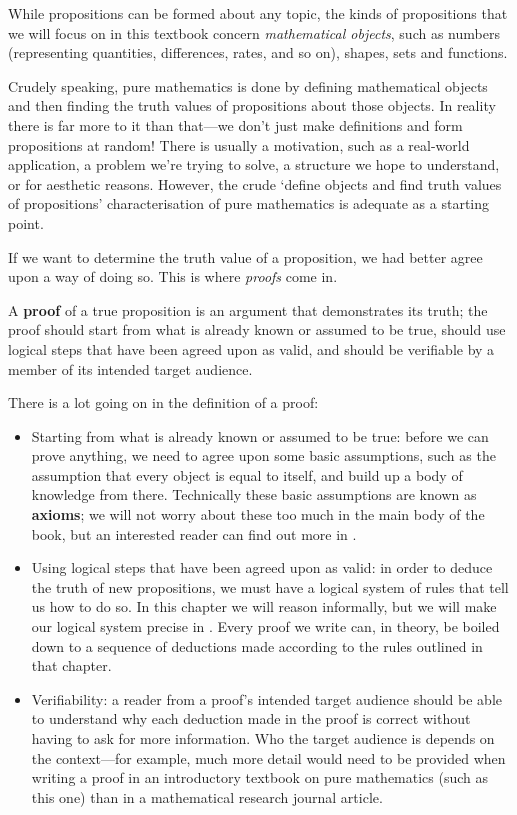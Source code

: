 While propositions can be formed about any topic, the kinds of propositions that we will focus on in this textbook concern \textit{mathematical objects}, such as numbers (representing quantities, differences, rates, and so on), shapes, sets and functions.

Crudely speaking, pure mathematics is done by defining mathematical objects and then finding the truth values of propositions about those objects. In reality there is far more to it than that---we don't just make definitions and form propositions at random! There is usually a motivation, such as a real-world application, a problem we're trying to solve, a structure we hope to understand, or for aesthetic reasons. However, the crude `define objects and find truth values of propositions' characterisation of pure mathematics is adequate as a starting point.

If we want to determine the truth value of a proposition, we had better agree upon a way of doing so. This is where \textit{proofs} come in.

\begin{definition}
\label{defProof}
A \textbf{proof} of a true proposition is an argument that demonstrates its truth; the proof should start from what is already known or assumed to be true, should use logical steps that have been agreed upon as valid, and should be verifiable by a member of its intended target audience.
\end{definition}

There is a lot going on in the definition of a proof:
\begin{itemize}
\item Starting from what is already known or assumed to be true: before we can prove anything, we need to agree upon some basic assumptions, such as the assumption that every object is equal to itself, and build up a body of knowledge from there. Technically these basic assumptions are known as \textbf{axioms}; we will not worry about these too much in the main body of the book, but an interested reader can find out more in .
\item Using logical steps that have been agreed upon as valid: in order to deduce the truth of new propositions, we must have a logical system of rules that tell us how to do so. In this chapter we will reason informally, but we will make our logical system precise in . Every proof we write can, in theory, be boiled down to a sequence of deductions made according to the rules outlined in that chapter.
\item Verifiability: a reader from a proof's intended target audience should be able to understand why each deduction made in the proof is correct without having to ask for more information. Who the target audience is depends on the context---for example, much more detail would need to be provided when writing a proof in an introductory textbook on pure mathematics (such as this one) than in a mathematical research journal article.
\end{itemize}

